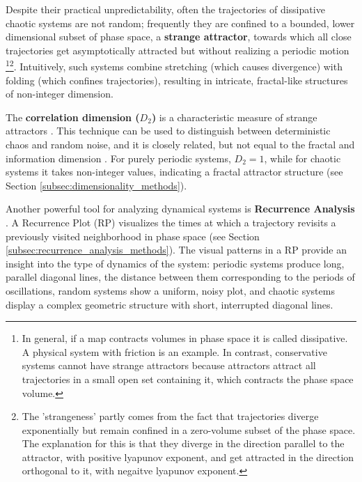 \documentclass[a4paper,12pt]{article}
\begin{document}
    Despite their practical unpredictability, often the trajectories of dissipative chaotic systems are not random; frequently they are confined to a bounded, lower dimensional subset of phase space, a \textbf{strange attractor}, towards which all close trajectories get asymptotically attracted but without realizing a periodic motion \footnote{In general, if a map contracts volumes in phase space it is called dissipative. A physical system with friction is an example. In contrast, conservative systems cannot have strange attractors because attractors attract all trajectories in a small open set containing it, which contracts the phase space volume.}\footnote{The 'strangeness' partly comes from the fact that trajectories diverge exponentially but remain confined in a zero-volume subset of the phase space. The explanation for this is that they diverge in the direction parallel to the attractor, with positive lyapunov exponent, and get attracted in the direction orthogonal to it, with negaitve lyapunov exponent.}.
    Intuitively, such systems combine stretching (which causes divergence) with folding (which confines trajectories), resulting in intricate, fractal-like structures of non-integer dimension. 

    The \textbf{correlation dimension ($D_2$)} is a characteristic measure of strange attractors \cite{GRASSBERGER1983189}. This technique can be used to distinguish between deterministic chaos and random noise, and it is closely related, but not equal to the fractal and information dimension \cite{GRASSBERGER1983189}. For purely periodic systems, $D_2 = 1$, while for chaotic systems it takes non-integer values, indicating a fractal attractor structure (see Section \ref{subsec:dimensionality_methods}).

    Another powerful tool for analyzing dynamical systems is \textbf{Recurrence Analysis} \cite{MARWAN2007237}. A Recurrence Plot (RP) visualizes the times at which a trajectory revisits a previously visited neighborhood in phase space (see Section \ref{subsec:recurrence_analysis_methods}).
    The visual patterns in a RP provide an insight into the type of dynamics of the system: periodic systems produce long, parallel diagonal lines, the distance between them corresponding to the periods of oscillations, random systems show a uniform, noisy plot, and chaotic systems display a complex geometric structure with short, interrupted diagonal lines. %
\end{document}
